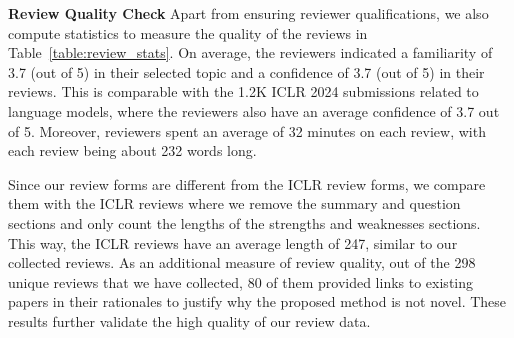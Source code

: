 


 
\textbf{Review Quality Check} 
Apart from ensuring reviewer qualifications, we also compute statistics to measure the quality of the reviews in Table~\ref{table:review_stats}.
On average, the reviewers indicated a familiarity of 3.7 (out of 5) in their selected topic and a confidence of 3.7 (out of 5) in their reviews. This is comparable with the 1.2K ICLR 2024 submissions related to language models, where the reviewers also have an average confidence of 3.7 out of 5. Moreover, reviewers spent an average of 32 minutes on each review, with each review being about 232 words long. 

Since our review forms are different from the ICLR review forms, we compare them with the ICLR reviews where we remove the summary and question sections and only count the lengths of the strengths and weaknesses sections. This way, the ICLR reviews have an average length of 247, similar to our collected reviews. 
As an additional measure of review quality, out of the 298 unique reviews that we have collected, 80 of them provided links to existing papers in their rationales to justify why the proposed method is not novel. These results further validate the high quality of our review data. 

